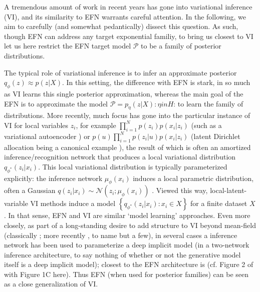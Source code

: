 \documentclass{article}
\begin{document}
A tremendous amount of work in recent years has gone into variational inference (VI), and its similarity to EFN warrants careful attention. 
In the following, we aim to carefully (and somewhat pedantically) dissect this question.  
As such, though EFN can address any target exponential familiy, to bring us closest to VI let us here restrict the EFN target model $\mathcal{P}$ to be a family of posterior distributions.  

The typical role of variational inference is to infer an approximate posterior $q_\phi(z) \approx p(z |X)$.  
In this setting, the difference with EFN is stark, in so much as VI learns this single posterior approximation, whereas the main goal of the EFN is to approximate the model $\mathcal{P} = p_\eta(z|X): \eta in H$: to learn the family of distributions.  
More recently, much focus has gone into the particular instance of VI for local variables $z_i$, for example $\prod_{i=1}^N p(z_i)p(x_i | z_i)$ (such as a variational autoencoder \cite{Kingma:2013aa}) or  $p(u)\prod_{i=1}^N p(z_i|u)p(x_i | z_i)$ (latent Dirichlet allocation being a canonical example \cite{blei2003latent,blei2017variational}), the result of which is often an amortized inference/recognition network that produces a local variational distribution $q_{\phi^*}(z_i | x_i)$.  
This local variational distribution is typically parameterized explicitly: the inference network $\mu_\phi(x_i)$ induces a local parametric distribution, often a Gaussian $q(z_i | x_i) \sim \mathcal{N}\left(z_i; \mu_\phi(x_i)\right)$ \cite[for example]{Kingma:2013aa}.  Viewed this way, local-latent-variable VI methods induce a model $\left\{  q_{\phi^*}(z_i | x_i) : x_i \in X \right\}$ for a finite dataset $X$.   In that sense, EFN and VI are similar `model learning' approaches.
Even more closely, as part of a long-standing desire to add structure to VI beyond mean-field (classically \cite{saul1996exploiting, barber1999tractable}; more recently \cite{hoffman2015stochastic,tran2015copula}, to name but a few), in several cases a inference network has been used to parameterize a deep implicit model (in a two-network inference architecture, to say nothing of whether or not the generative model itself is a deep implicit model); closest to the EFN architecture is \cite{rezende2015variational} (cf. Figure 2 of \cite{rezende2015variational} with Figure 1C here).   Thus EFN (when used for posterior families) can be seen as a close generalization of VI.   
\end{document}
